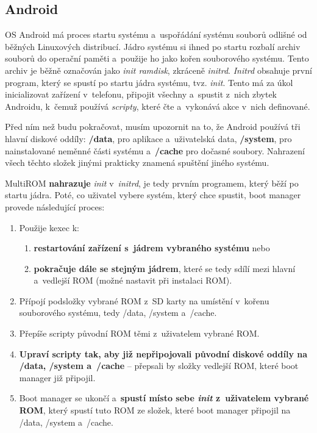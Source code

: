 \documentclass[12pt, a4paper, oneside]{article}
\newcommand{\B}{\textbf} %
\newcommand{\It}{\textit}  %
\begin{document}
\subsection{Android}
OS Android má proces startu systému a~uspořádání systému souborů odlišné od běžných Linuxových distribucí. Jádro systému si ihned po startu rozbalí archiv souborů do operační paměti a~použije ho jako kořen souborového systému. Tento archiv je běžně označován jako \It{init ramdisk}, zkráceně \It{initrd}. \It{Initrd} obsahuje první program, který se spustí po startu jádra systému, tvz. \It{init}. Tento má za úkol inicializovat zařízení v~telefonu, připojit všechny  a~spustit z~nich zbytek Androidu, k~čemuž používá \It{scripty}, které čte a~vykonává akce v~nich definované.

Před ním než budu pokračovat, musím upozornit na to, že Android používá tři hlavní diskové oddíly: \B{/data}, pro aplikace a~uživatelská data, \B{/system}, pro nainstalované neměnné části systému a~\B{/cache} pro dočasné soubory. Nahrazení všech těchto složek jinými prakticky znamená spuštění jiného systému.

MultiROM \B{nahrazuje} \It{init} v~\It{initrd}, je tedy prvním programem, který běží po startu jádra. Poté, co uživatel vybere systém, který chce spustit, boot manager provede následující proces:

\begin{enumerate}
    \item Použije kexec k:
    \begin{enumerate}
        \item \B{restartování zařízení s~jádrem vybraného systému} nebo
        \item \B{pokračuje dále se stejným jádrem}, které se tedy sdílí mezi hlavní a~vedlejší ROM (možné nastavit při instalaci ROM).
    \end{enumerate}
    \item Přípojí podsložky vybrané ROM z~SD karty na umístění v~kořenu souborového systému, tedy /data, /system a~/cache.
    \item Přepíše scripty původní ROM těmi z~uživatelem vybrané ROM.
    \item \B{Upraví scripty tak, aby již nepřipojovali původní diskové oddíly na /data, /system a~/cache} -- přepsali by složky vedlejší ROM, které boot manager již připojil.
    \item Boot manager se ukončí a~\B{spustí místo sebe \It{init} z~uživatelem vybrané ROM}, který spustí tuto ROM ze složek, které boot manager připojil na /data, /system a~/cache.
\end{enumerate}
\end{document}

